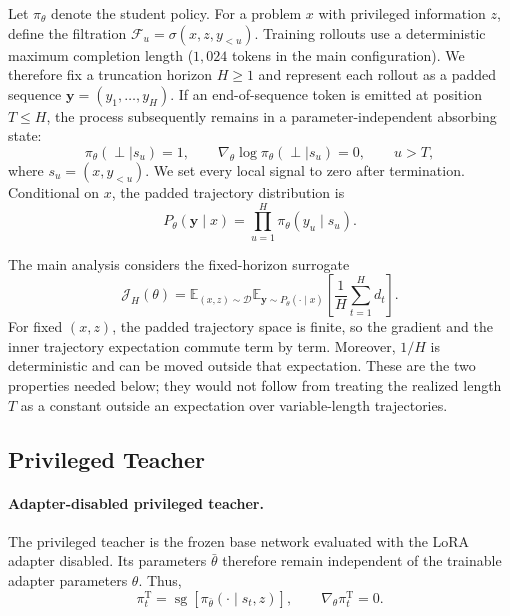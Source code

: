 \documentclass[letterpaper]{article} %
\begin{document}
Let $\pi_\theta$ denote the student policy. For a problem $x$ with
privileged information $z$, define the filtration
$\mathcal F_u=\sigma(x,z,y_{<u})$. Training rollouts use a deterministic
maximum completion length ($1{,}024$ tokens in the main configuration).
We therefore fix a truncation horizon $H\geq1$ and represent each
rollout as a padded sequence
$\mathbf y=(y_1,\ldots,y_H)$. If an end-of-sequence token is emitted at
position $T\leq H$, the process subsequently remains in a
parameter-independent absorbing state:
\begin{equation}
    \pi_\theta(\perp\mid s_u)=1,
    \qquad
    \nabla_\theta\log\pi_\theta(\perp\mid s_u)=0,
    \qquad u>T,
    \label{eq:supp_absorbing}
\end{equation}
where $s_u=(x,y_{<u})$. We set every local signal to zero after
termination. Conditional on $x$, the padded trajectory distribution is
\begin{equation}
    P_\theta(\mathbf y\mid x)
    =
    \prod_{u=1}^{H}\pi_\theta(y_u\mid s_u).
    \label{eq:supp_padded_factorization}
\end{equation}

The main analysis considers the fixed-horizon surrogate
\begin{equation}
    \mathcal J_H(\theta)
    =
    \mathbb E_{(x,z)\sim\mathcal D}
    \mathbb E_{\mathbf y\sim P_\theta(\cdot\mid x)}
    \left[
        \frac{1}{H}\sum_{t=1}^{H}d_t
    \right].
    \label{eq:supp_fixed_horizon_objective}
\end{equation}
For fixed $(x,z)$, the padded trajectory space is finite, so the
gradient and the inner trajectory expectation commute term by term.
Moreover, $1/H$ is deterministic and can be moved outside that
expectation. These are the two properties needed below; they would not
follow from treating the realized length $T$ as a constant outside an
expectation over variable-length trajectories.

\subsection{Privileged Teacher}
\label{app:teacher}

\paragraph{Adapter-disabled privileged teacher.}
The privileged teacher is the frozen base network evaluated with the
LoRA adapter disabled. Its parameters $\bar\theta$ therefore remain
independent of the trainable adapter parameters $\theta$. Thus,
\begin{equation}
    \pi_t^{\mathrm T}
    =
    \operatorname{sg}\!\left[
        \pi_{\bar\theta}(\cdot\mid s_t,z)
    \right],
    \qquad
    \nabla_\theta\pi_t^{\mathrm T}=0.
\end{equation}
\end{document}
